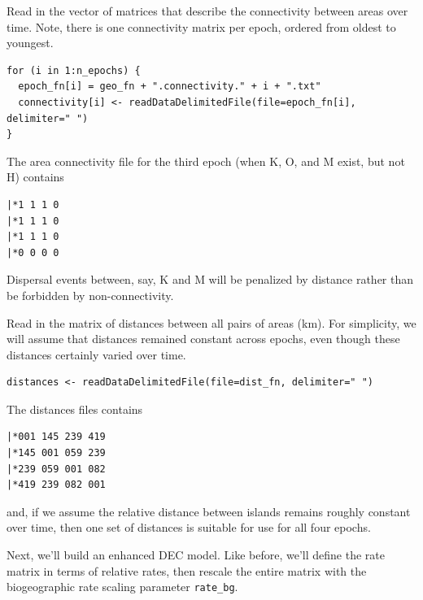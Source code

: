 Read in the vector of matrices that describe the connectivity between areas over time.
Note, there is one connectivity matrix per epoch, ordered from oldest to youngest.

\begin{snugshade}
\begin{lstlisting}
for (i in 1:n_epochs) {
  epoch_fn[i] = geo_fn + ".connectivity." + i + ".txt"
  connectivity[i] <- readDataDelimitedFile(file=epoch_fn[i], delimiter=" ")
}
\end{lstlisting}
\end{snugshade}

The area connectivity file for the third epoch (when K, O, and M exist, but not H) contains

\begin{snugshade}
\begin{lstlisting}
|*1 1 1 0
|*1 1 1 0
|*1 1 1 0
|*0 0 0 0
\end{lstlisting}
\end{snugshade}

Dispersal events between, say, K and M will be penalized by distance rather than be forbidden by non-connectivity.


Read in the matrix of distances between all pairs of areas (km).
For simplicity, we will assume that distances remained constant across epochs, even though these distances certainly varied over time.

\begin{snugshade}
\begin{lstlisting}
distances <- readDataDelimitedFile(file=dist_fn, delimiter=" ")
\end{lstlisting}
\end{snugshade}

The distances files contains

\begin{snugshade}
\begin{lstlisting}
|*001 145 239 419
|*145 001 059 239
|*239 059 001 082
|*419 239 082 001
\end{lstlisting}
\end{snugshade}

and, if we assume the relative distance between islands remains roughly constant over time, then one set of distances is suitable for use for all four epochs.


Next, we'll build an enhanced DEC model. Like before, we'll define the rate matrix in terms of relative rates, then rescale the entire matrix with the biogeographic rate scaling parameter {\tt rate\_bg}.


